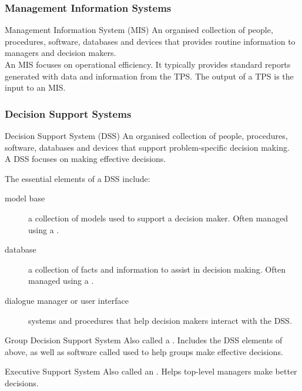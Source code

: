 \documentclass[\main/notes.tex]{subfiles}
\begin{document}
				\subsubsection{Management Information Systems}
					\begin{definition}{Management Information System (MIS)}
						An organised collection of people, procedures, software, databases and devices that provides routine information to managers and decision makers.\\
						An MIS focuses on operational efficiency. It typically provides standard reports generated with data and information from the TPS. The output of a TPS is the input to an MIS.
					\end{definition}
				\subsubsection{Decision Support Systems}
					\begin{definition}{Decision Support System (DSS)}
						An organised collection of people, procedures, software, databases and devices that support problem-specific decision making.\\
						A DSS focuses on making effective decisions.
					\end{definition}
					The essential elements of a DSS include:
					\begin{indentparagraph}
						\begin{description}
							\item[model base] a collection of models used to support a decision maker. Often managed using a .
							\item[database] a collection of facts and information to assist in decision making. Often managed using a .
							\item[dialogue manager or user interface] systems and procedures that help decision makers interact with the DSS.
						\end{description}
					\end{indentparagraph}
					\begin{definition}{Group Decision Support System}
						Also called a . Includes the DSS elements of above, as well as software called  used to help groups make effective decisions.
					\end{definition}
					\begin{definition}{Executive Support System}
						Also called an . Helps top-level managers make better decisions.
					\end{definition}
\end{document}
